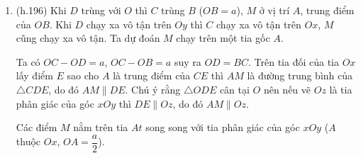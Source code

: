 \begin{bt}
{\begin{enumerate}
\begin{minipage}{8cm}
\begin{center}
\textit{Hình 195}
		\end{center}
	\end{minipage}
	\begin{minipage}{8cm}
		\begin{center}

\textit{Hình 196}
		\end{center}
	\end{minipage}
	
			\item (h.196) Khi $D$ trùng với $O$ thì $C$ trùng $B$ ($OB = a$), $M$ ở vị trí $A$, trung điểm của $OB$. Khi $D$ chạy xa vô tận trên $Oy$ thì $C$ chạy xa vô tận trên $Ox$, $M$ cũng chạy xa vô tận. Ta dự đoán $M$ chạy trên một tia gốc $A$.
			
			Ta có $OC - OD = a$, $OC - OB = a$ suy ra $OD = BC$. Trên tia đối của tia $Ox$ lấy điểm $E$ sao cho $A$ là trung điểm của $CE$ thì $AM$ là đường trung bình của $\triangle{CDE}$, do đó $AM \parallel DE$. Chú ý rằng $\triangle{ODE}$ cân tại $O$ nên nếu vẽ $Oz$ là tia phân giác của góc $xOy$ thì $DE \parallel Oz$, do đó $AM \parallel Oz$.
			
			Các điểm $M$ nằm trên tia $At$ song song với tia phân giác của góc $xOy$ ($A$ thuộc $Ox$, $OA = \dfrac{a}{2}$).
		\end{enumerate}
	}
	\end{bt}

